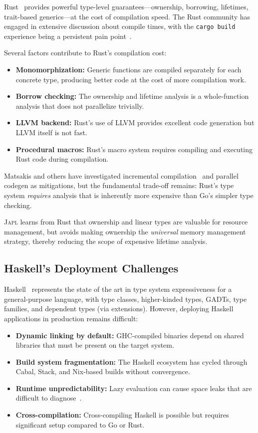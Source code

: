 \documentclass[11pt,twocolumn]{article}
\newcommand{\japl}{\textsc{Japl}}
\begin{document}
Rust~\citep{matsakis2014rust,klabnik2019rust} provides powerful type-level guarantees---ownership, borrowing, lifetimes, trait-based generics---at the cost of compilation speed.
The Rust community has engaged in extensive discussion about compile times, with the \texttt{cargo build} experience being a persistent pain point~\citep{rust-compile-survey-2023}.

Several factors contribute to Rust's compilation cost:
\begin{itemize}[leftmargin=*]
\item \textbf{Monomorphization:} Generic functions are compiled separately for each concrete type, producing better code at the cost of more compilation work.
\item \textbf{Borrow checking:} The ownership and lifetime analysis is a whole-function analysis that does not parallelize trivially.
\item \textbf{LLVM backend:} Rust's use of LLVM provides excellent code generation but LLVM itself is not fast.
\item \textbf{Procedural macros:} Rust's macro system requires compiling and executing Rust code during compilation.
\end{itemize}

Matsakis and others have investigated incremental compilation~\citep{matsakis2016incremental} and parallel codegen as mitigations, but the fundamental trade-off remains: Rust's type system \emph{requires} analysis that is inherently more expensive than Go's simpler type checking.

\japl{} learns from Rust that ownership and linear types are valuable for resource management, but avoids making ownership the \emph{universal} memory management strategy, thereby reducing the scope of expensive lifetime analysis.

\subsection{Haskell's Deployment Challenges}

Haskell~\citep{marlow2010haskell,jones2003haskell} represents the state of the art in type system expressiveness for a general-purpose language, with type classes, higher-kinded types, GADTs, type families, and dependent types (via extensions).
However, deploying Haskell applications in production remains difficult:

\begin{itemize}[leftmargin=*]
\item \textbf{Dynamic linking by default:} GHC-compiled binaries depend on shared libraries that must be present on the target system.
\item \textbf{Build system fragmentation:} The Haskell ecosystem has cycled through Cabal, Stack, and Nix-based builds without convergence.
\item \textbf{Runtime unpredictability:} Lazy evaluation can cause space leaks that are difficult to diagnose~\citep{mitchell2013leaking}.
\item \textbf{Cross-compilation:} Cross-compiling Haskell is possible but requires significant setup compared to Go or Rust.
\end{itemize}
\end{document}

